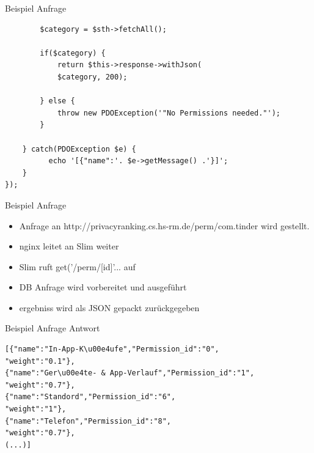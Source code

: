 \documentclass[compress,t]{beamer}
\begin{document}
\begin {frame}[fragile]{Beispiel Anfrage}

    \begin{center}
        \begin{lstlisting}
        $category = $sth->fetchAll();

        if($category) {
            return $this->response->withJson(
            $category, 200);

        } else {
            throw new PDOException('"No Permissions needed."');
        }

    } catch(PDOException $e) {
          echo '[{"name":'. $e->getMessage() .'}]';
    }
});
        \end{lstlisting}
    \end{center}

\end{frame}

\begin {frame}{Beispiel Anfrage}

    \begin{center}
         \begin{itemize}
            \item Anfrage an http://privacyranking.cs.hs-rm.de/perm/com.tinder wird gestellt.
            \item nginx leitet an Slim weiter
            \item Slim ruft get('/perm/[{id}]'... auf
            \item DB Anfrage wird vorbereitet und ausgeführt
            \item ergebniss wird als JSON gepackt zurückgegeben
        \end{itemize}
    \end{center}

\end{frame}

\begin {frame}[fragile]{Beispiel Anfrage Antwort}

    \begin{center}
            \begin{lstlisting}
[{"name":"In-App-K\u00e4ufe","Permission_id":"0",
"weight":"0.1"},
{"name":"Ger\u00e4te- & App-Verlauf","Permission_id":"1",
"weight":"0.7"},
{"name":"Standord","Permission_id":"6",
"weight":"1"},
{"name":"Telefon","Permission_id":"8",
"weight":"0.7"},
(...)]
            \end{lstlisting}
    \end{center}

\end{frame}
\end{document}
